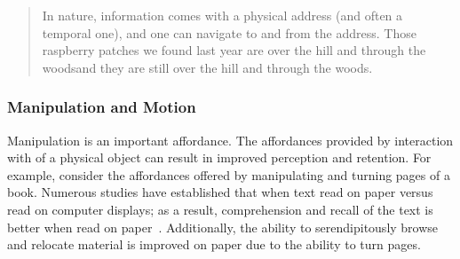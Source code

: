 \documentclass[conference]{IEEEtran}
\begin{document}
\begin{quote}
In nature, information comes with a physical address (and often a temporal one), and one can navigate to and from the address. Those raspberry patches we found last year are over the hill and through the woods\textemdash and they are still over the hill and through the woods.
\end{quote}




\subsubsection{Manipulation and Motion}

Manipulation is an important affordance.  The affordances provided by interaction with of a physical object can result in improved perception and retention. 
For example, consider the affordances offered by manipulating and turning pages of a book.
Numerous studies have established that when text read on paper versus read on computer displays; 
as a result, comprehension and recall of the text is better when read on paper~\cite{Noyes:2008}.  
Additionally, the ability to serendipitously browse and relocate material is improved on paper due 
to the ability to turn pages.
\end{document}
